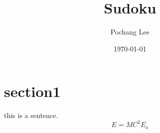 \documentclass[24pt,a4paper]{article}
\begin{document}
	\title{Sudoku}
	\author{Pochang Lee}
	\date{\today}
	\maketitle
	\section{section1}
		this is a sentence.
\begin{equation}
E=MC^2
E_a
\end{equation}
\end{document}
